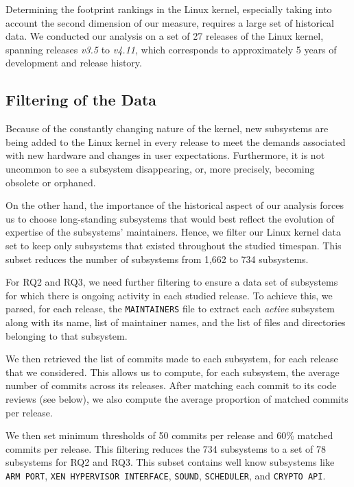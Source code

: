 Determining the footprint rankings in the Linux kernel, especially taking into account the second dimension of our measure, requires a large set of historical data. We conducted our analysis on a set of 27 releases of the Linux kernel, spanning releases \textit{v3.5} to \textit{v4.11}, which corresponds to approximately 5 years of development and release history. 


\subsection{Filtering of the Data}
\label{sec:data-filtering}

Because of the constantly changing nature of the kernel, new subsystems are being added to the Linux kernel in every release to meet the demands associated with new hardware and changes in user expectations. Furthermore, it is not uncommon to see a subsystem disappearing, or, more precisely, becoming obsolete or orphaned.

On the other hand, the importance of the historical aspect of our analysis forces us to choose long-standing subsystems that would best reflect the evolution of expertise of the subsystems' maintainers. Hence, we filter our Linux kernel data set to keep only subsystems that existed throughout the studied timespan. This subset reduces the number of subsystems from 1,662 to 734 subsystems.

For RQ2 and RQ3, we need further filtering to ensure a data set of subsystems for which there is ongoing activity in each studied release. To achieve this, we %
parsed, for each release, the \texttt{MAINTAINERS} file to extract each \textit{active} subsystem along with its name, list of maintainer names, and the list of files and directories belonging to that subsystem.

We then retrieved the list of commits made to each subsystem, for each release that we considered. This allows us to compute, for each subsystem, the average number of commits across its releases. After matching each commit to its code reviews (see below), we also compute the average proportion of matched commits per release.

We then set minimum thresholds of 50 commits per release and 60\% matched commits per release. This filtering reduces the 734 subsystems to a set of 78 subsystems for RQ2 and RQ3. This subset contains well know subsystems like \texttt{ARM PORT}, \texttt{XEN HYPERVISOR INTERFACE}, \texttt{SOUND}, \texttt{SCHEDULER}, and \texttt{CRYPTO API}.

